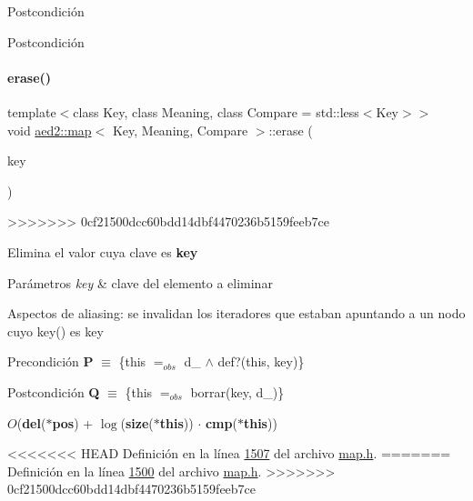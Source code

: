 \begin{DoxyPostcond}{\-Postcondición}
\begin{DoxyPostcond}{\-Postcondición}
\paragraph{\texorpdfstring{erase()}{erase()}\hspace{0.1cm}{\footnotesize\ttfamily [2/2]}}
{\footnotesize\ttfamily template$<$class Key, class Meaning, class Compare = std\+::less$<$\+Key$>$$>$ \\
void \hyperlink{classaed2_1_1map}{aed2\+::map}$<$ Key, Meaning, Compare $>$\+::erase (\begin{DoxyParamCaption}\item[{const Key \&}]{key }\end{DoxyParamCaption})\hspace{0.3cm}{\ttfamily [inline]}}
>>>>>>> 0cf21500dcc60bdd14dbf4470236b5159feeb7ce



Elimina el valor cuya clave es {\bfseries key} 


\begin{DoxyParams}{Parámetros}
{\em key} & clave del elemento a eliminar\\
\hline
\end{DoxyParams}
\begin{DoxyParagraph}{Aspectos de aliasing\+:}
se invalidan los iteradores que estaban apuntando a un nodo cuyo key() es key
\end{DoxyParagraph}
\begin{DoxyPrecond}{Precondición}
{\bfseries P} $\equiv$ \{this $=_{obs}$ d\+\_ $\land$ def?(this, key)\} 
\end{DoxyPrecond}
\begin{DoxyPostcond}{Postcondición}
{\bfseries Q} $\equiv$ \{this $=_{obs}$ borrar(key, d\+\_)\}
\end{DoxyPostcond}

\begin{DoxyDescription}
\item[Complejidad Temporal]$O$({\bfseries del}({\bfseries $\ast$pos}) + $\log$({\bfseries size}({\bfseries $\ast$this})) $\cdot$ {\bfseries cmp}({\bfseries $\ast$this}))
\end{DoxyDescription}

<<<<<<< HEAD
\-Definición en la línea \hyperlink{map_8h_source_l01507}{1507} del archivo \hyperlink{map_8h_source}{map.\-h}.
=======
Definición en la línea \hyperlink{map_8h_source_l01500}{1500} del archivo \hyperlink{map_8h_source}{map.\+h}.
>>>>>>> 0cf21500dcc60bdd14dbf4470236b5159feeb7ce


\end{DoxyPostcond}
\end{DoxyPostcond}
